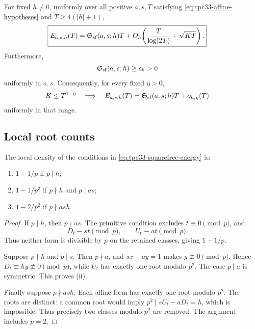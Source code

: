 \begin{theorem}
\label{thm:tpc33-uniform-squarefree-energy}
For fixed \(h\ne0\), uniformly over all positive \(a,s,T\) satisfying
\eqref{eq:tpc33-affine-hypotheses} and \(T\ge4(|h|+1)\),
\begin{equation}
 \boxed{
 E_{a,s,h}(T)
 =\mathfrak S_{\rm sf}(a,s;h)T
 +O_h\!\left(
   \frac{T}{\log(2T)}+\sqrt{KT}
  \right).}
 \label{eq:tpc33-squarefree-asymptotic}
\end{equation}
Furthermore,
\begin{equation}
 \mathfrak S_{\rm sf}(a,s;h)\ge c_h>0
 \label{eq:tpc33-squarefree-positive}
\end{equation}
uniformly in \(a,s\).  Consequently, for every fixed \(\eta>0\),
\begin{equation}
 K\le T^{1-\eta}
 \quad\Longrightarrow\quad
 E_{a,s,h}(T)
 =\mathfrak S_{\rm sf}(a,s;h)T+o_{h,\eta}(T)
 \label{eq:tpc33-squarefree-growing-slope-range}
\end{equation}
uniformly in that range.
\end{theorem}

\subsection{Local root counts}

\begin{lemma}
\label{lem:tpc33-local-squarefree-factors}
The local density of the conditions in
\eqref{eq:tpc33-squarefree-energy} is:
\begin{enumerate}[label=\textup{(\roman*)}]
 \item \(1-1/p\) if \(p\mid h\);
 \item \(1-1/p^2\) if \(p\nmid h\) and \(p\mid as\);
 \item \(1-2/p^2\) if \(p\nmid ash\).
\end{enumerate}
\end{lemma}

\begin{proof}
If \(p\mid h\), then \(p\nmid as\).  The primitive condition excludes
\(t\equiv0\pmod p\), and
\[
 D_t\equiv st\pmod p,
 \qquad
 U_t\equiv at\pmod p.
\]
Thus neither form is divisible by \(p\) on the retained classes, giving
\(1-1/p\).

Suppose \(p\nmid h\) and \(p\mid s\).  Then \(p\nmid a\), and
\(sx-ay=1\) makes \(y\not\equiv0\pmod p\).  Hence \(D_t\equiv hy\not\equiv0
\pmod p\), while \(U_t\) has exactly one root modulo \(p^2\).  The case
\(p\mid a\) is symmetric.  This proves (ii).

Finally suppose \(p\nmid ash\).  Each affine form has exactly one root
modulo \(p^2\).  The roots are distinct: a common root would imply
\(p^2\mid sU_t-aD_t=h\), which is impossible.  Thus precisely two classes
modulo \(p^2\) are removed.  The argument includes \(p=2\).
\end{proof}

